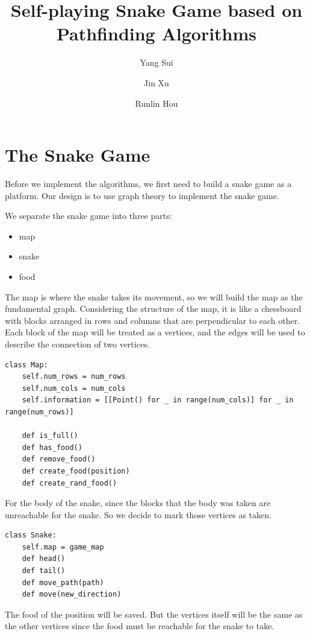\documentclass[12pt]{article}
\begin{document}
\title{\textbf{Self-playing Snake Game based on Pathfinding Algorithms}}
\author{Yang Sui \and Jin Xu \and Runlin Hou}

\maketitle

\section{The Snake Game}
Before we implement the algorithms, we first need to build a snake game as a platform. Our design is to use graph theory to implement the snake game. 

We separate the snake game into three parts:
\begin{itemize}
    \item map
    \item snake
    \item food
\end{itemize}

The map is where the snake takes its movement, so we will build the map as the fundamental graph. Considering the structure of the map, it is like a  chessboard with blocks arranged in rows and columns that are perpendicular to each other. Each block of the map will be treated as a vertices, and the edges will be used to describe the connection of two vertices. 

\begin{lstlisting}
class Map:
    self.num_rows = num_rows
    self.num_cols = num_cols
    self.information = [[Point() for _ in range(num_cols)] for _ in range(num_rows)]

    def is_full()
    def has_food()
    def remove_food()
    def create_food(position)
    def create_rand_food()
\end{lstlisting}

For the body of the snake, since the blocks that the body was taken are unreachable for the snake. So we decide to mark those vertices as taken.
\begin{lstlisting}
class Snake:
    self.map = game_map
    def head()
    def tail()
    def move_path(path)
    def move(new_direction)
\end{lstlisting}

The food of the position will be saved. But the vertices itself will be the same as the other vertices since the food must be reachable for the snake to take.
\end{document}
